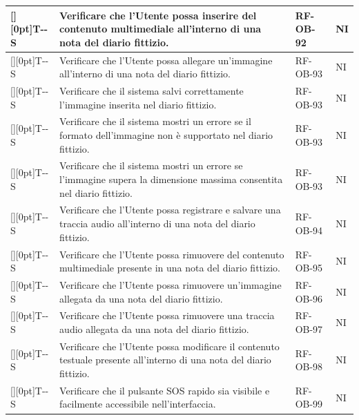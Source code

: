 \documentclass[a4paper,12pt]{article}
\newcounter{testsys}
\newcommand{\systestcode}{%
  \raisebox{0pt}[\height][0pt]{\hypertarget{T-\arabic{testsys}-S}{}}T-\arabic{testsys}-S%
}
\begin{document}
\begin{longtable}{| >{\centering\arraybackslash}p{} | >{\raggedright\arraybackslash}p{} | >{\centering\arraybackslash}p{} | >{\centering\arraybackslash}p{} |}
\stepcounter{testsys} \systestcode & Verificare che l'Utente possa inserire del contenuto multimediale all'interno di una nota del diario fittizio. & RF-OB-92 & NI \\
\hline

\stepcounter{testsys} \systestcode & Verificare che l'Utente possa allegare un'immagine all'interno di una nota del diario fittizio. & RF-OB-93 & NI \\
\hline

\stepcounter{testsys} \systestcode & Verificare che il sistema salvi correttamente l'immagine inserita nel diario fittizio. & RF-OB-93 & NI \\
\hline

\stepcounter{testsys} \systestcode & Verificare che il sistema mostri un errore se il formato dell'immagine non è supportato nel diario fittizio. & RF-OB-93 & NI \\
\hline

\stepcounter{testsys} \systestcode & Verificare che il sistema mostri un errore se l'immagine supera la dimensione massima consentita nel diario fittizio. & RF-OB-93 & NI \\
\hline

\stepcounter{testsys} \systestcode & Verificare che l'Utente possa registrare e salvare una traccia audio all'interno di una nota del diario fittizio. & RF-OB-94 & NI \\
\hline

\stepcounter{testsys} \systestcode & Verificare che l'Utente possa rimuovere del contenuto multimediale presente in una nota del diario fittizio. & RF-OB-95 & NI \\
\hline

\stepcounter{testsys} \systestcode & Verificare che l'Utente possa rimuovere un'immagine allegata da una nota del diario fittizio. & RF-OB-96 & NI \\
\hline

\stepcounter{testsys} \systestcode & Verificare che l'Utente possa rimuovere una traccia audio allegata da una nota del diario fittizio. & RF-OB-97 & NI \\
\hline

\stepcounter{testsys} \systestcode & Verificare che l'Utente possa modificare il contenuto testuale presente all'interno di una nota del diario fittizio. & RF-OB-98 & NI \\
\hline
\hline

\stepcounter{testsys} \systestcode & Verificare che il pulsante SOS rapido sia visibile e facilmente accessibile nell'interfaccia. & RF-OB-99 & NI \\
\hline


\end{longtable}
\end{document}
